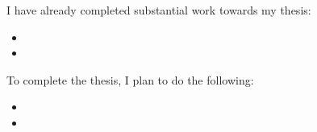\documentclass{article}
\begin{document}
I have already completed substantial work towards my thesis:

\begin{itemize}
\item {}
\item {}
\end{itemize}
To complete the thesis, I plan to do the following:
\begin{itemize}
\item {}
\item {}
\end{itemize}



\end{document}
